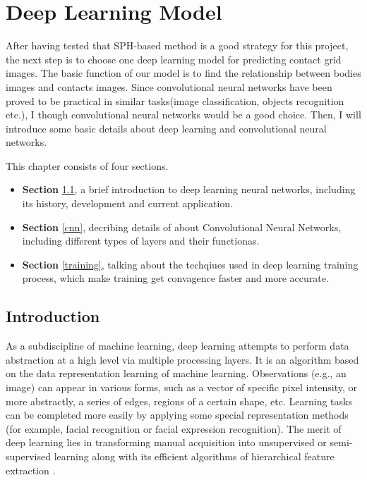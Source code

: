 \chapter{Deep Learning Model}
\label{cp:dp}
After having tested that SPH-based method is a good strategy for this project, the next step is to choose one deep learning model for predicting contact grid images. The basic function of our model is to find the relationship between bodies images and contacts images. Since convolutional neural networks have been proved to be practical in similar tasks(image classification, objects recognition etc.), I though convolutional neural networks would be a good choice. Then, I will introduce some basic details about deep learning and convolutional neural networks.

This chapter consists of four sections. 
\begin{itemize}
    \item \textbf{Section} \ref{dpintro}, a brief introduction to deep learning neural networks, including its history, development and current application.
    \item \textbf{Section} \ref{cnn}, decribing details of about Convolutional Neural Networks, including different types of layers and their functionas.
    \item \textbf{Section} \ref{training}, talking about the techqiues used in deep learning training process, which make training get convagence faster and more accurate.  
\end{itemize} 

\section{Introduction}
    \label{dpintro}
    As a subdiscipline of machine learning, deep learning attempts to perform data abstraction at a high level via multiple processing layers. It is an algorithm based on the data representation learning of machine learning. Observations (e.g., an image) can appear in various forms, such as a vector of specific pixel intensity, or more abstractly, a series of edges, regions of a certain shape, etc. Learning tasks can be completed more easily by applying some special representation methods (for example, facial recognition or facial expression recognition). The merit of deep learning lies in transforming manual acquisition into unsupervised or semi-supervised learning along with its efficient algorithms of hierarchical feature extraction \cite{schmidhuber2015deep}.

